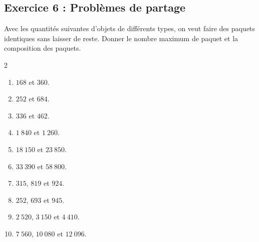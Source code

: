 \documentclass[14 pt]{extarticle}
\theoremstyle{plain}
\begin{document}
  \subsection*{Exercice 6 : Problèmes de partage}
  
  Avec les quantités suivantes d'objets de différents types, on veut faire des paquets identiques sans laisser de reste. Donner le nombre maximum de paquet et la composition des paquets. 
  \begin{multicols}{2}
  \begin{enumerate}
  
 \item $168$ et $360$. 
 \item $252$ et $684$. 
 \item $336$ et $462$. 
 \item $1~840$ et $1~260$. 
 \item $18~150$ et $23~850$. 
 \item $33~390$ et $58~800$. 
 \item $315$, $819$ et $924$. 
 \item $252$, $693$ et $945$. 
 \item $2~520$, $3~150$ et $4~410$. 
 \item $7~560$, $10~080$ et $12~096$. 
  \end{enumerate}\end{multicols}
 	
\end{document}
